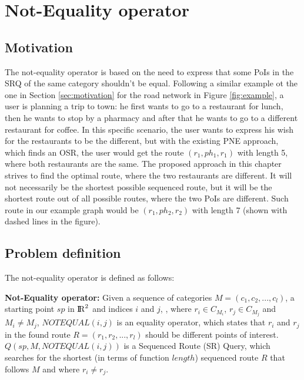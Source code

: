 


\section{Not-Equality operator}

\subsection{Motivation}
\label{sec:motNEO}
The not-equality operator is based on the need to express that some PoIs in the SRQ of the same category shouldn't be equal. Following a similar example ot the one in Section \ref{sec:motivation} for the road network in Figure \ref{fig:example}, a user is planning a trip to town: he first wants to go to a restaurant for lunch, then he wants to stop by a pharmacy and after that he wants to go to a different restaurant for coffee. In this specific scenario, the user wants to express his wish for the restaurants to be the different, but with the existing PNE \cite{OSR} approach, which finds an OSR, the user would get the route $(r_1, ph_1, r_1)$ with length 5, where both restaurants are the same. The proposed approach in this chapter strives to find the optimal route, where the two restaurants are different. It will not necessarily be the shortest possible sequenced route, but it will be the shortest route out of all possible routes, where the two PoIs are different. Such route in our example graph would be $(r_1, ph_2, r_2)$ with length 7 (shown with dashed lines in the figure).

\subsection{Problem definition} 
\label{sec:problemNEO}
The not-equality operator is defined as follows:

\textbf{Not-Equality operator:} Given a sequence of categories $M = (c_1, c_2, ..., c_l)$, a starting point $sp$ in ${\rm I\!R}^2$ and indices $i$ and $j$, , where $r_i \in C_{M_{i}}$, $r_j \in C_{M_{j}}$ and $M_i \neq M_j$, $NOTEQUAL(i, j)$ is an equality operator, which states that $r_i$ and $r_j$ in the found route $R = (r_1, r_2, ..., r_l)$ should be different points of interest.
$Q(sp, M, NOTEQUAL(i, j))$ is a Sequenced Route (SR) Query, which searches for the shortest (in terms of function $length$) sequenced route $R$ that follows $M$ and where $r_i \neq r_j$.

